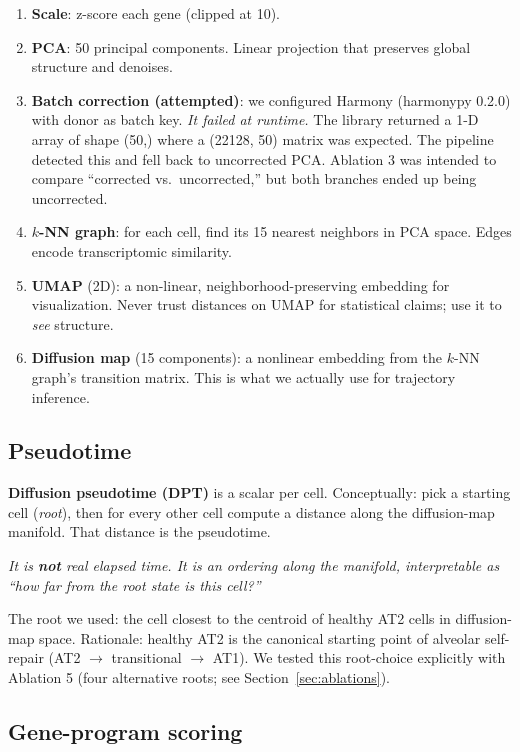 \documentclass[11pt]{article}
\newcommand{\note}[1]{{\color{note}\textit{#1}}}
\begin{document}
\begin{enumerate}
\item \textbf{Scale}: z-score each gene (clipped at 10).
\item \textbf{PCA}: 50 principal components. Linear projection that preserves global structure and denoises.
\item \textbf{Batch correction (attempted)}: we configured Harmony (harmonypy 0.2.0) with donor as batch key. \emph{It failed at runtime.} The library returned a 1-D array of shape (50,) where a (22128, 50) matrix was expected. The pipeline detected this and fell back to uncorrected PCA. Ablation 3 was intended to compare ``corrected vs.\ uncorrected,'' but both branches ended up being uncorrected.
\item \textbf{$k$-NN graph}: for each cell, find its 15 nearest neighbors in PCA space. Edges encode transcriptomic similarity.
\item \textbf{UMAP} (2D): a non-linear, neighborhood-preserving embedding for visualization. Never trust distances on UMAP for statistical claims; use it to \emph{see} structure.
\item \textbf{Diffusion map} (15 components): a nonlinear embedding from the $k$-NN graph's transition matrix. This is what we actually use for trajectory inference.
\end{enumerate}

\subsection{Pseudotime}

\textbf{Diffusion pseudotime (DPT)} is a scalar per cell. Conceptually: pick a starting cell (\emph{root}), then for every other cell compute a distance along the diffusion-map manifold. That distance is the pseudotime.

\note{It is \textbf{not} real elapsed time. It is an ordering along the manifold, interpretable as ``how far from the root state is this cell?''}

The root we used: the cell closest to the centroid of healthy AT2 cells in diffusion-map space. Rationale: healthy AT2 is the canonical starting point of alveolar self-repair (AT2 $\rightarrow$ transitional $\rightarrow$ AT1). We tested this root-choice explicitly with Ablation 5 (four alternative roots; see Section~\ref{sec:ablations}).

\subsection{Gene-program scoring}
\end{document}
